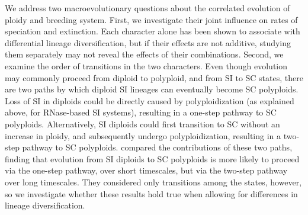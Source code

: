 We address two macroevolutionary questions about the correlated evolution of ploidy and breeding system.
First, we investigate their joint influence on rates of speciation and extinction.
Each character alone has been shown to associate with differential lineage diversification, but if their effects are not additive, studying them separately may not reveal the effects of their combinations.
Second, we examine the order of transitions in the two characters.
Even though evolution may commonly proceed from diploid to polyploid, and from SI to SC states, there are two paths by which diploid SI lineages can eventually become SC polyploids.
Loss of SI in diploids could be directly caused by polyploidization (as explained above, for RNase-based SI systems), resulting in a one-step pathway to SC polyploids. 
Alternatively, SI diploids could first transition to SC without an increase in ploidy, and subsequently undergo polyploidization, resulting in a two-step pathway to SC polyploids.
\citet{robertson_2011} compared the contributions of these two paths, finding that evolution from SI diploids to SC polyploids is more likely to proceed via the one-step pathway, over short timescales, but via the two-step pathway over long timescales.
They considered only transitions among the states, however, so we investigate whether these results hold true when allowing for differences in lineage diversification.

